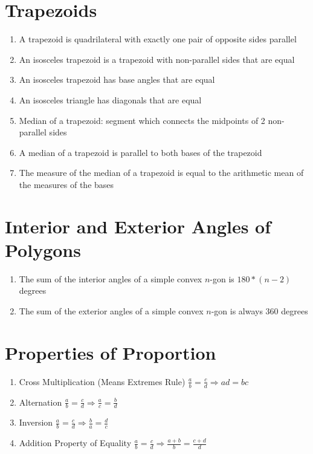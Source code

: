 \documentclass[11pt,letterpaper]{report}
\begin{document}
\section*{Trapezoids}
\begin{enumerate}
    \item A trapezoid is quadrilateral with exactly one pair of opposite sides parallel
    \item An isosceles trapezoid is a trapezoid with non-parallel sides that are equal
    \item An isosceles trapezoid has base angles that are equal
    \item An isosceles triangle has diagonals that are equal
    \item Median of a trapezoid: segment which connects the midpoints of 2 non-parallel sides
    \item A median of a trapezoid is parallel to both bases of the trapezoid
    \item The measure of the median of a trapezoid is equal to the arithmetic mean of the measures of the bases
\end{enumerate}

\section*{Interior and Exterior Angles of Polygons}
\begin{enumerate}
    \item The sum of the interior angles of a simple convex $n$-gon is $180*(n-2)$ degrees
    \item The sum of the exterior angles of a simple convex $n$-gon is always 360 degrees
\end{enumerate}

\section*{Properties of Proportion}
\begin{enumerate}
    \item Cross Multiplication (Means Extremes Rule) $\frac{a}{b}=\frac{c}{d}\Rightarrow ad=bc$
    \item Alternation $\frac{a}{b}=\frac{c}{d}\Rightarrow\frac{a}{c}=\frac{b}{d}$
    \item Inversion $\frac{a}{b}=\frac{c}{d}\Rightarrow\frac{b}{a}=\frac{d}{c}$
    \item Addition Property of Equality $\frac{a}{b}=\frac{c}{d}\Rightarrow\frac{a + b}{b}=\frac{c + d}{d}$
\end{enumerate}
\end{document}
